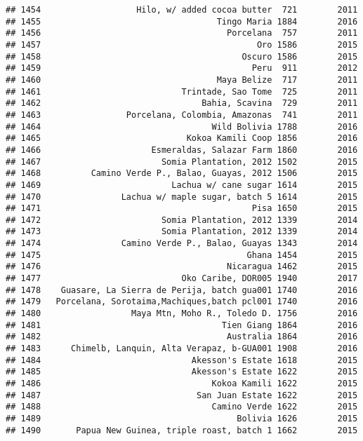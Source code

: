 \documentclass[
]{article}
\begin{document}
\begin{verbatim}
## 1454                   Hilo, w/ added cocoa butter  721        2011
## 1455                                   Tingo Maria 1884        2016
## 1456                                     Porcelana  757        2011
## 1457                                           Oro 1586        2015
## 1458                                        Oscuro 1586        2015
## 1459                                          Peru  911        2012
## 1460                                   Maya Belize  717        2011
## 1461                            Trintade, Sao Tome  725        2011
## 1462                                Bahia, Scavina  729        2011
## 1463                 Porcelana, Colombia, Amazonas  741        2011
## 1464                                  Wild Bolivia 1788        2016
## 1465                             Kokoa Kamili Coop 1856        2016
## 1466                      Esmeraldas, Salazar Farm 1860        2016
## 1467                        Somia Plantation, 2012 1502        2015
## 1468          Camino Verde P., Balao, Guayas, 2012 1506        2015
## 1469                          Lachua w/ cane sugar 1614        2015
## 1470                Lachua w/ maple sugar, batch 5 1614        2015
## 1471                                          Pisa 1650        2015
## 1472                        Somia Plantation, 2012 1339        2014
## 1473                        Somia Plantation, 2012 1339        2014
## 1474                Camino Verde P., Balao, Guayas 1343        2014
## 1475                                         Ghana 1454        2015
## 1476                                     Nicaragua 1462        2015
## 1477                            Oko Caribe, DOR005 1940        2017
## 1478    Guasare, La Sierra de Perija, batch gua001 1740        2016
## 1479   Porcelana, Sorotaima,Machiques,batch pcl001 1740        2016
## 1480                  Maya Mtn, Moho R., Toledo D. 1756        2016
## 1481                                    Tien Giang 1864        2016
## 1482                                     Australia 1864        2016
## 1483      Chimelb, Lanquin, Alta Verapaz, b-GUA001 1908        2016
## 1484                              Akesson's Estate 1618        2015
## 1485                              Akesson's Estate 1622        2015
## 1486                                  Kokoa Kamili 1622        2015
## 1487                               San Juan Estate 1622        2015
## 1488                                  Camino Verde 1622        2015
## 1489                                       Bolivia 1626        2015
## 1490       Papua New Guinea, triple roast, batch 1 1662        2015

\end{verbatim}
\end{document}
